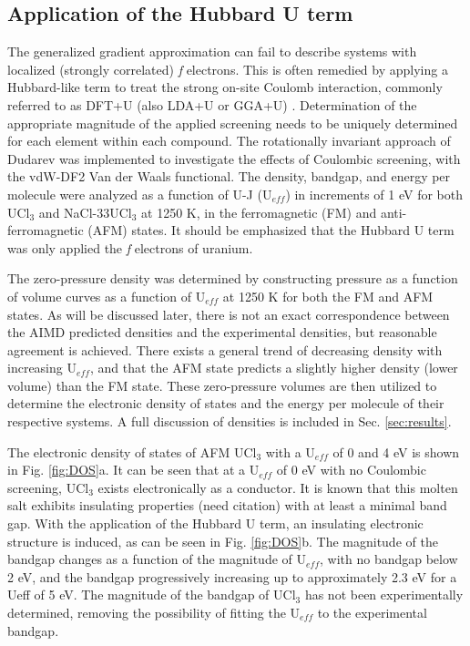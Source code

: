 \documentclass[preprint,3p,10pt,onecolumn,number,sort&compress]{elsarticle}
\begin{document}

\subsection{Application of the Hubbard U term}

The generalized gradient approximation can fail to describe systems with localized (strongly correlated) \textit{f} electrons. This is often remedied by applying a Hubbard-like term to treat the strong on-site Coulomb interaction, commonly referred to as DFT+U (also LDA+U or GGA+U) \cite{rohrbach2003}. Determination of the appropriate magnitude of the applied screening needs to be uniquely determined for each element within each compound. The rotationally invariant approach of Dudarev \cite{dudarev1998} was implemented to investigate the effects of Coulombic screening, with the vdW-DF2 Van der Waals functional. The density, bandgap, and energy per molecule were analyzed as a function of U-J (U$_{eff}$) in increments of 1 eV for both UCl$_3$ and NaCl-33UCl$_3$ at 1250 K, in the ferromagnetic (FM) and anti-ferromagnetic (AFM) states. It should be emphasized that the Hubbard U term was only applied  the \textit{f} electrons of uranium. 

The zero-pressure density was determined by constructing pressure as a function of volume curves as a function of U$_{eff}$ at 1250 K for both the FM and AFM states. As will be discussed later, there is not an exact correspondence between the AIMD predicted densities and the experimental densities, but reasonable agreement is achieved. There exists a general trend of decreasing density with increasing U$_{eff}$, and that the AFM state predicts a slightly higher density (lower volume) than the FM state. These zero-pressure volumes are then utilized to determine the electronic density of states and the energy per molecule of their respective systems. A full discussion of densities is included in Sec. \ref{sec:results}. 

The electronic density of states of AFM UCl$_3$ with a U$_{eff}$ of 0 and 4 eV is shown in Fig. \ref{fig:DOS}a. It can be seen that at a U$_{eff}$ of 0 eV with no Coulombic screening, UCl$_3$ exists electronically as a conductor. It is known that this molten salt exhibits insulating properties {\color{red}(need citation)} with at least a minimal band gap. With the application of the Hubbard U term, an insulating electronic structure is induced, as can be seen in Fig. \ref{fig:DOS}b. The magnitude of the bandgap changes as a function of the magnitude of U$_{eff}$, with no bandgap below 2 eV, and the bandgap progressively increasing up to approximately 2.3 eV for a Ueff of 5 eV. The magnitude of the bandgap of UCl$_3$ has not been experimentally determined, removing the possibility of fitting the U$_{eff}$ to the experimental bandgap. 
\end{document}
